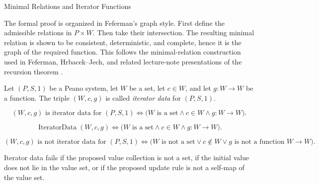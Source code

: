 \begin{topicbox}{Minimal Relations and Iterator Functions}
\begin{exposition}
The formal proof is organized in Feferman's graph style. First define the
admissible relations in $P\times W$. Then take their intersection. The
resulting minimal relation is shown to be consistent, deterministic, and
complete, hence it is the graph of the required function. This follows the
minimal-relation construction used in Feferman, Hrbacek--Jech, and related
lecture-note presentations of the recursion theorem
\citep{feferman1964numbersystems,hrbacek_jech1999,chi_recursion_wustl}.
\end{exposition}

\begin{tcolorbox}[colback=defbox, colframe=defborder, arc=2pt,
  left=6pt, right=6pt, top=4pt, bottom=4pt,
  title={\small\textbf{Definition (Iterator Data)}},
  fonttitle=\small\bfseries]
\begin{definition}
\label{def:iterator-data-on-peano-system}
Let $(P,S,1)$ be a Peano system, let $W$ be a set, let $c\in W$, and let
$g:W\to W$ be a function. The triple $(W,c,g)$ is called \emph{iterator data}
for $(P,S,1)$.
\end{definition}
\end{tcolorbox}

\begin{remark*}
\[
(W,c,g) \text{ is iterator data for } (P,S,1)
\Longleftrightarrow
\bigl(W \text{ is a set}\land c\in W\land g:W\to W\bigr).
\]
\end{remark*}

\begin{remark*}
\[
\operatorname{IteratorData}(W,c,g)
\Longleftrightarrow
\bigl(W \text{ is a set}\land c\in W\land g:W\to W\bigr).
\]
\end{remark*}

\begin{remark*}
\[
(W,c,g) \text{ is not iterator data for } (P,S,1)
\Longleftrightarrow
\bigl(W \text{ is not a set}\lor c\notin W\lor g \text{ is not a function } W\to W\bigr).
\]
\end{remark*}

\begin{remark*}
Iterator data fails if the proposed value collection is not a set, if the
initial value does not lie in the value set, or if the proposed update rule is
not a self-map of the value set.
\end{remark*}


\end{topicbox}
